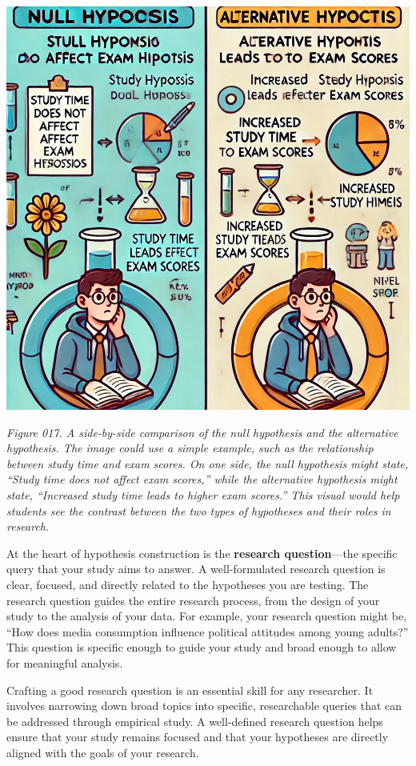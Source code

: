 \documentclass[
]{book}
\begin{document}
\includegraphics[width=1\linewidth,height=\textheight,keepaspectratio]{images/fig017.jpg}

\emph{Figure 017. A side-by-side comparison of the null hypothesis and the alternative hypothesis. The image could use a simple example, such as the relationship between study time and exam scores. On one side, the null hypothesis might state, ``Study time does not affect exam scores,'' while the alternative hypothesis might state, ``Increased study time leads to higher exam scores.'' This visual would help students see the contrast between the two types of hypotheses and their roles in research.}

At the heart of hypothesis construction is the \textbf{research question}---the specific query that your study aims to answer. A well-formulated research question is clear, focused, and directly related to the hypotheses you are testing. The research question guides the entire research process, from the design of your study to the analysis of your data. For example, your research question might be, ``How does media consumption influence political attitudes among young adults?'' This question is specific enough to guide your study and broad enough to allow for meaningful analysis.

Crafting a good research question is an essential skill for any researcher. It involves narrowing down broad topics into specific, researchable queries that can be addressed through empirical study. A well-defined research question helps ensure that your study remains focused and that your hypotheses are directly aligned with the goals of your research.
\end{document}
